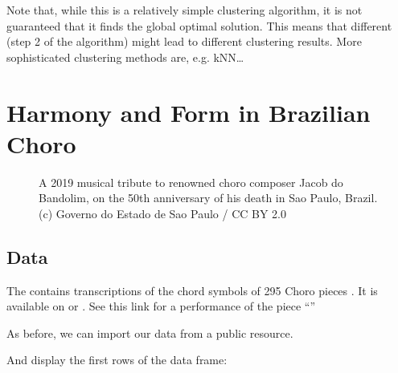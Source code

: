 \documentclass[letterpaper,10pt,english]{sphinxmanual}
\begin{document}
Note that, while this is a relatively simple clustering algorithm, it is not guaranteed that it
finds the global optimal solution. This means that different  (step 2 of the algorithm)
might lead to different clustering results. More sophisticated clustering methods are, e.g. kNN…


\chapter{Harmony and Form in Brazilian Choro}
\label{\detokenize{choro:harmony-and-form-in-brazilian-choro}}\label{\detokenize{choro::doc}}
\begin{figure}[htbp]
\centering
\capstart

\noindent{}
\caption{A 2019 musical tribute to renowned choro composer Jacob do Bandolim,
on the 50th anniversary of his death in Sao Paulo, Brazil. (c) Governo do Estado de Sao Paulo / CC BY 2.0}\label{\detokenize{choro:id2}}\end{figure}


\section{Data}
\label{\detokenize{choro:data}}
The  contains transcriptions of the chord symbols
of 295 Choro pieces . It is available on  or .
See this link for a performance of the piece “”

As before, we can import our data from a public resource.

\begin{sphinxVerbatim}[commandchars=\\\{\}]
  
   \PYGZbs{}
\end{sphinxVerbatim}

And display the first rows of the data frame:

\begin{sphinxVerbatim}[commandchars=\\\{\}]
\end{sphinxVerbatim}
\end{document}
